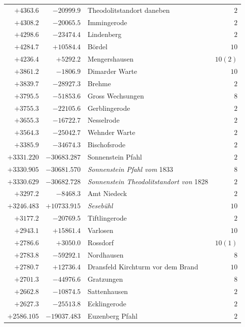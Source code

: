 \begin{center}
\begin{tabular}{r|r|p{170pt}|r}
\(+4363.6\)&\(-20999.9\)&Theodolitstandort daneben&\(2\)\\
\(+4308.2\)&\(-20065.5\)&Immingerode&\(2\)\\
\(+4298.6\)&\(-23474.4\)&Lindenberg&\(2\)\\
\(+4284.7\)&\(+10584.4\)&Bördel&\(10\)\\
\(+4236.4\)&\(+5292.2\)&Mengershausen&\(10(2)\)\\
\(+3861.2\)&\(-1806.9\)&Dimarder Warte&\(10\)\\
\(+3839.7\)&\(-28927.3\)&Brehme&\(2\)\\
\(+3795.5\)&\(-51853.6\)&Gross Wechsungen&\(8\)\\
\(+3755.3\)&\(-22105.6\)&Gerblingerode&\(2\)\\
\(+3655.3\)&\(-16722.7\)&Nesselrode&\(2\)\\
\(+3564.3\)&\(-25042.7\)&Wehnder Warte&\(2\)\\
\(+3385.9\)&\(-34674.3\)&Bischofsrode&\(2\)\\
\(+3331.220\)&\(-30683.287\)&Sonnenstein Pfahl&\(2\)\\
\(+3330.905\)&\(-30681.570\)&\textit{Sonnenstein Pfahl vom} 1833&\(8\)\\
\(+3330.629\)&\(-30682.728\)&\textit{Sonnenstein Theodolitstandort von} 1828&\(2\)\\
\(+3297.2\)&\(-8468.3\)&Amt Niedeck&\(2\)\\
\(+3246.483\)&\(+10733.915\)&\textit{Sesebühl}&\(10\)\\
\(+3177.2\)&\(-20769.5\)&Tiftlingerode&\(2\)\\
\(+2943.1\)&\(+15861.4\)&Varlosen&\(10\)\\
\(+2786.6\)&\(+3050.0\)&Rossdorf&\(10(1)\)\\
\(+2783.8\)&\(-59292.1\)&Nordhausen&\(8\)\\
\(+2780.7\)&\(+12736.4\)&Dransfeld Kirchturm vor dem Brand&\(10\)\\
\(+2701.3\)&\(-44976.6\)&Gratzungen&\(8\)\\
\(+2662.8\)&\(-10874.5\)&Sattenhausen&\(2\)\\
\(+2627.3\)&\(-25513.8\)&Ecklingerode&\(2\)\\
\(+2586.105\)&\(-19037.483\)&Euzenberg Pfahl&\(2\)\\
\hline\end{tabular}\endgroup\end{center}
\clearpage
